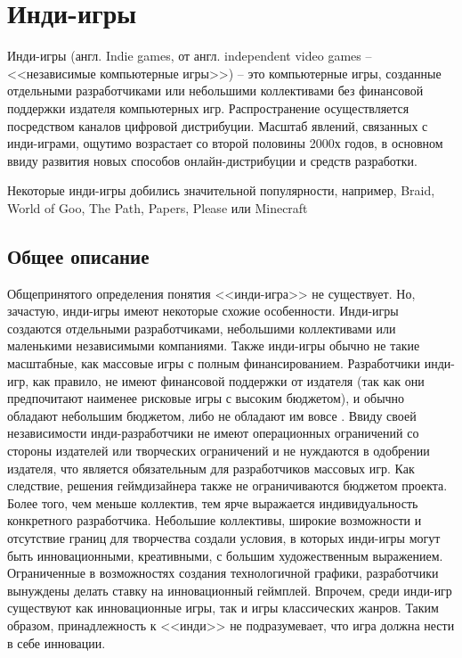 \chapter{Инди-игры}
Инди-игры (англ. Indie games, от англ. independent video games -- <<независимые компьютерные игры>>) -- это
компьютерные игры, созданные отдельными разработчиками или небольшими коллективами без финансовой поддержки
издателя компьютерных игр. Распространение осуществляется посредством каналов цифровой дистрибуции. Масштаб
явлений, связанных с инди-играми, ощутимо возрастает со второй половины 2000х годов, в основном ввиду
развития новых способов онлайн-дистрибуции и средств разработки.

Некоторые инди-игры добились значительной популярности, например, Braid\cite{2.1}, World of Goo\cite{2.2}, 
The Path, Papers, Please или Minecraft\cite{2.3}

\section{Общее описание}
Общепринятого определения понятия <<инди-игра>> не существует\cite{2.5,2.7}. Но, зачастую, 
инди-игры имеют некоторые схожие особенности. Инди-игры создаются отдельными разработчиками, 
небольшими коллективами или маленькими независимыми компаниями\cite{2.5}. Также инди-игры обычно не 
такие масштабные, как массовые игры с полным финансированием. Разработчики инди-игр, как правило, не 
имеют финансовой поддержки от издателя (так как они предпочитают наименее рисковые игры с высоким 
бюджетом\cite{2.10}), и обычно обладают небольшим бюджетом, либо не обладают им вовсе
\cite{2.5,2.7,2.12}. Ввиду своей независимости инди-разработчики не имеют операционных 
ограничений со стороны издателей или творческих ограничений\cite{2.5,2.13,2.7} и не нуждаются в
одобрении издателя, что является обязательным для разработчиков массовых игр. Как 
следствие, решения геймдизайнера также не ограничиваются бюджетом проекта\cite{2.13}. Более того, чем меньше 
коллектив, тем ярче выражается индивидуальность конкретного разработчика\cite{2.15}. Небольшие коллективы, 
широкие возможности и отсутствие границ для творчества создали условия, в которых инди-игры могут быть 
инновационными, креативными, с большим художественным выражением\cite{2.15,2.16,2.17,2.19}. 
Ограниченные в возможностях создания технологичной графики, разработчики вынуждены делать ставку на 
инновационный геймплей\cite{2.20}. Впрочем, среди инди-игр существуют как инновационные игры, так и игры 
классических жанров\cite{2.17}. Таким образом, принадлежность к <<инди>> не подразумевает, что игра должна 
нести в себе инновации\cite{2.21}.

